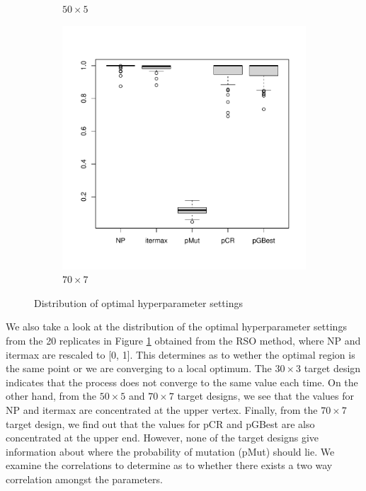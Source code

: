 \documentclass [PhD] {package/uclathes}
\begin{document}
\begin{figure}
\begin{subfigure}[b]{0.3\textwidth}
\caption{$50\times 5$}
\end{subfigure}
\begin{subfigure}[b]{0.3\textwidth}
\centering
\includegraphics{chapters/RSO/pdfs/corplot70}
\caption{$70\times 7$}
\end{subfigure}
\caption{Distribution of optimal hyperparameter settings}
\label{fig:optimalpoints}
\end{figure}

We also take a look at the distribution of the optimal hyperparameter settings from the 20 replicates in Figure \ref{fig:optimalpoints} obtained {from the RSO method, where NP and itermax are rescaled to [0, 1]}. This determines as to wether the optimal region is the same point or we are converging to a local optimum.
The $30 \times 3$ target design indicates that the process does not converge to the same value each time. On the other hand, from the $50 \times 5$ and $70 \times 7$ target designs, we see that the  values for NP and itermax  are concentrated at the upper vertex. Finally, from the $70 \times 7$ target design, we find out that the values for pCR and pGBest  are also  concentrated at the upper end. However, none of the target designs give information about where the probability of mutation (pMut) should lie.
We examine the correlations to determine as to whether there exists a two way correlation amongst the parameters.
\end{document}
